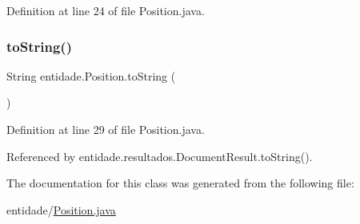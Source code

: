 Definition at line 24 of file Position.\+java.

\hypertarget{classentidade_1_1Position_a65d216cd9c1de82bf23771f01a34c793}{}\label{classentidade_1_1Position_a65d216cd9c1de82bf23771f01a34c793} 
\subsubsection{\texorpdfstring{to\+String()}{toString()}}
{\footnotesize\ttfamily String entidade.\+Position.\+to\+String (\begin{DoxyParamCaption}{ }\end{DoxyParamCaption})}



Definition at line 29 of file Position.\+java.



Referenced by entidade.\+resultados.\+Document\+Result.\+to\+String().



The documentation for this class was generated from the following file\+:\begin{DoxyCompactItemize}
\item 
entidade/\hyperlink{Position_8java}{Position.\+java}\end{DoxyCompactItemize}
